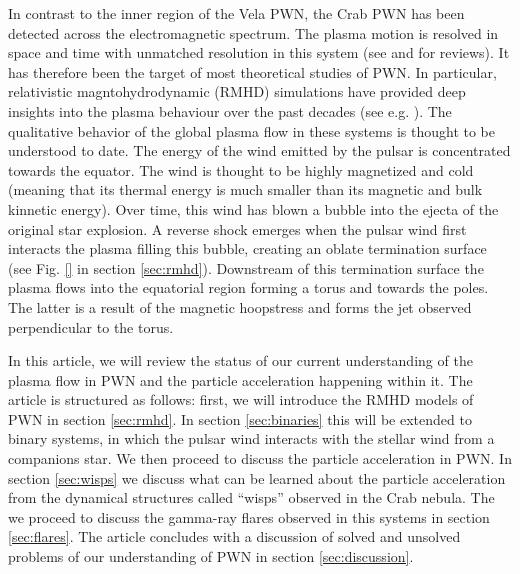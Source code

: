 In contrast to the inner region of the Vela PWN, the Crab PWN has been detected across the electromagnetic spectrum. The plasma motion is resolved in space and time with unmatched resolution in this system (see \citet{Hester_2008} and \citet{BuehlerBlandford2013a} for reviews). It has therefore been the target of most theoretical studies of PWN. In particular, relativistic magntohydrodynamic (RMHD) simulations have provided deep insights into the plasma behaviour over the past decades (see e.g.  \citet{Komissarov_2004,Del_Zanna_2006,Porth_2013}). The qualitative behavior of the global plasma flow in these systems is thought to be understood to date. The energy of the wind emitted by the pulsar is concentrated towards the equator. The wind is thought to be highly magnetized and cold (meaning that its thermal energy is much smaller than its magnetic and bulk kinnetic energy). Over time, this wind has blown a bubble into the ejecta of the original star explosion. A reverse shock emerges when the pulsar wind first interacts the plasma filling this bubble, creating an oblate termination surface (see Fig. \ref{} in section \ref{sec:rmhd}). Downstream of this termination surface the plasma flows into the equatorial region forming a torus and towards the poles. The latter is a result of the magnetic hoopstress and forms the jet observed perpendicular to the torus.

In this article, we will review the status of our current understanding of the plasma flow in PWN and the particle acceleration happening within it.  The article is structured as follows: first, we will introduce the RMHD models of PWN in section \ref{sec:rmhd}. In section \ref{sec:binaries} this will be extended to binary systems, in which the pulsar wind interacts with the stellar wind from a companions star. We then proceed to discuss the particle acceleration in PWN. In section \ref{sec:wisps} we discuss what can be learned about the particle acceleration from the dynamical structures called ``wisps'' observed in the Crab nebula. The we proceed to discuss the gamma-ray flares observed in this systems in section \ref{sec:flares}. The article concludes with a discussion of solved and unsolved problems of our understanding of PWN in section \ref{sec:discussion}.